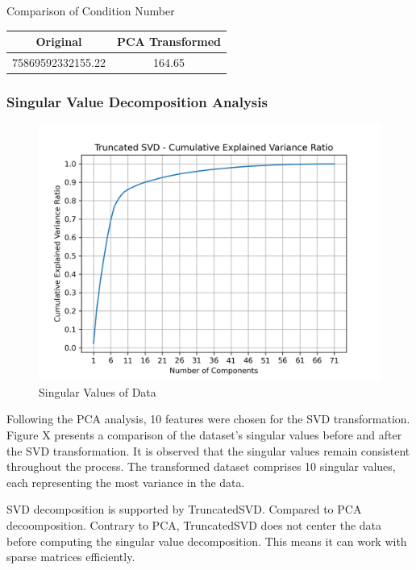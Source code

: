 \begin{center}
    Comparison of Condition Number
\begin{table}[ht]
\centering
    \begin{tabular}{cc}
        \toprule
        Original & PCA Transformed \\
        \midrule
        75869592332155.22 & 164.65 \\
        \bottomrule
    \end{tabular}
\end{table}
\end{center}


\subsubsection{Singular Value Decomposition Analysis}

\begin{figure}[h]
\centering
\includegraphics[width=\textwidth]{docs//assets/svd.png}
\caption{Singular Values of Data}
\end{figure}

Following the PCA analysis, 10 features were chosen for the SVD transformation. Figure X presents a comparison of the dataset's singular values before and after the SVD transformation. It is observed that the singular values remain consistent throughout the process. The transformed dataset comprises 10 singular values, each representing the most variance in the data.

SVD decomposition is supported by TruncatedSVD. Compared to PCA decoomposition. Contrary to PCA, TruncatedSVD does not center the data before computing the singular value decomposition. This means it can work with sparse matrices efficiently\cite{pedregosa2011scikit}.

